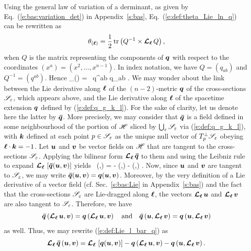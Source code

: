 Using the general law of variation of a derminant, as given by Eq.~(\ref{e:bas:variation_det})
in Appendix~\ref{s:bas}, Eq.~(\ref{e:def:theta_Lie_ln_q}) can be rewritten as
\[
    \theta_{(\bm{\ell})} = \frac{1}{2} \, \mathrm{tr} \left(Q^{-1} \times \bm{\mathcal{L}}_{\bm{\ell}}\, Q \right) ,
\]
when $Q$ is the matrix representing the components of $\bm{q}$ with respect to the
coordinates $(x^a) = (x^2,\ldots, x^{n-1})$. In index notation, we have
$Q = (q_{ab})$ and $Q^{-1} = (q^{ab})$. Hence
\be \label{e:def:theta_q_ab}
    \theta_{(\wl)} =  \, q^{ab} \Liec{\el} q_{ab} .
\ee
We may wonder about the link between the Lie derivative along $\bm{\ell}$ of the $(n-2)$-metric
$\bm{q}$ of the cross-sections $\mathscr{S}_\varepsilon$, which appears above, and
the Lie derivative along $\bm{\ell}$ of the spacetime extension $\bm{q}$ defined by
(\ref{e:def:q_g_k_l}). For the sake of clarity, let us denote here the latter
by $\bm{\bar q}$. More precisely, we may consider that $\bm{\bar q}$ is a
field defined in some neighbourhood of the portion of $\mathscr{H}$ sliced by
$\bigcup_{\varepsilon} \mathscr{S}_\varepsilon$ via (\ref{e:def:q_g_k_l}), with $\bm{k}$
defined at each point $p\in\mathscr{S}_\varepsilon$ as the unique null vector of
$T_p^\perp\mathscr{S}_\varepsilon$ obeying $\bm{\ell}\cdot\bm{k}=-1$.
Let $\bm{u}$ and $\bm{v}$ be vector fields on $\mathscr{H}$ that are tangent
to the cross-sections $\mathscr{S}_\varepsilon$. Applying the bilinear form
$\bm{\mathcal{L}}_{\bm{\ell}}\,\bm{\bar q}$ to them and using the Leibniz rule to expand
$\bm{\mathcal{L}}_{\bm{\ell}}\, \left[ \bm{\bar q}(\bm{u},\bm{v}) \right]$ yields
\be \label{e:def:Lie_l_bar_q}
     \Lie{\el}  \, (,) = \Lie{\el} 
        - \left(\Lie{\el},\right)
         - \left(,\Lie{\el}\right) .
\ee
Now, since $\bm{u}$ and $\bm{v}$ are tangent to $\mathscr{S}_\varepsilon$, we may
write $\bm{\bar q}(\bm{u},\bm{v}) = \bm{q}(\bm{u},\bm{v})$. Moreover, by the very
definition of a Lie derivative of a vector field (cf. Sec.~\ref{s:bas:Lie}
in Appendix~\ref{s:bas}) and the fact that the cross-sections
$\mathscr{S}_\varepsilon$ are Lie-dragged along $\bm{\ell}$, the vectors
$\bm{\mathcal{L}}_{\bm{\ell}}\,\bm{u}$ and $\bm{\mathcal{L}}_{\bm{\ell}}\,\bm{v}$ are also tangent to $\mathscr{S}_\varepsilon$.
Therefore, we have
\[
    \bm{\bar q}\left(\bm{\mathcal{L}}_{\bm{\ell}}\,\bm{u},\bm{v}\right) = \bm{q} \left(\bm{\mathcal{L}}_{\bm{\ell}}\,\bm{u},\bm{v}\right)
    \quad\mbox{and}\quad
    \bm{\bar q}\left(\bm{u},\bm{\mathcal{L}}_{\bm{\ell}}\,\bm{v}\right) = \bm{q}\left(\bm{u},\bm{\mathcal{L}}_{\bm{\ell}}\,\bm{v}\right)
\]
as well. Thus, we may rewrite (\ref{e:def:Lie_l_bar_q}) as
\[
     \bm{\mathcal{L}}_{\bm{\ell}}\, \bm{\bar q} \, (\bm{u},\bm{v}) = \bm{\mathcal{L}}_{\bm{\ell}}\, \left[ \bm{q}(\bm{u},\bm{v}) \right]
        - \bm{q}\left(\bm{\mathcal{L}}_{\bm{\ell}}\,\bm{u},\bm{v}\right)
         - \bm{q}\left(\bm{u},\bm{\mathcal{L}}_{\bm{\ell}}\,\bm{v}\right) .
\]
